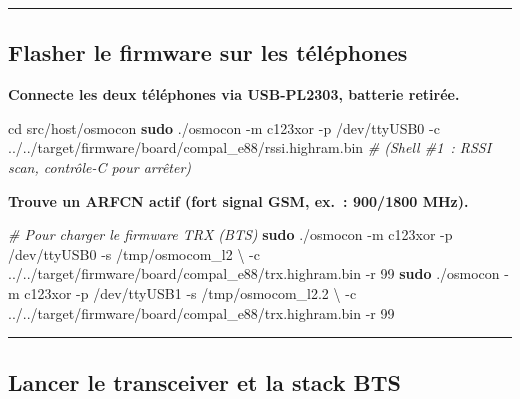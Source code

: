 \documentclass[
  french,
]{article}
\newenvironment{Shaded}{\begin{snugshade}}{\end{snugshade}}
\newcommand{\AttributeTok}[1]{\textcolor[rgb]{0.13,0.29,0.53}{#1}}
\newcommand{\BuiltInTok}[1]{#1}
\newcommand{\CommentTok}[1]{\textcolor[rgb]{0.56,0.35,0.01}{\textit{#1}}}
\newcommand{\DataTypeTok}[1]{\textcolor[rgb]{0.13,0.29,0.53}{#1}}
\newcommand{\FunctionTok}[1]{\textcolor[rgb]{0.13,0.29,0.53}{\textbf{#1}}}
\newcommand{\NormalTok}[1]{#1}
\begin{document}
\begin{center}\rule{0.5\linewidth}{0.5pt}\end{center}

\subsection{Flasher le firmware sur les
téléphones}\label{flasher-le-firmware-sur-les-tuxe9luxe9phones}

\textbf{Connecte les deux téléphones via USB-PL2303, batterie retirée.}

\begin{Shaded}
\begin{Highlighting}[]
\BuiltInTok{cd}\NormalTok{ src/host/osmocon}
\FunctionTok{sudo}\NormalTok{ ./osmocon }\AttributeTok{{-}m}\NormalTok{ c123xor }\AttributeTok{{-}p}\NormalTok{ /dev/ttyUSB0 }\AttributeTok{{-}c}\NormalTok{ ../../target/firmware/board/compal\_e88/rssi.highram.bin}
\CommentTok{\# (Shell \#1 : RSSI scan, contrôle{-}C pour arrêter)}
\end{Highlighting}
\end{Shaded}

\textbf{Trouve un ARFCN actif (fort signal GSM, ex.~: 900/1800 MHz).}

\begin{Shaded}
\begin{Highlighting}[]
\CommentTok{\# Pour charger le firmware TRX (BTS)}
\FunctionTok{sudo}\NormalTok{ ./osmocon }\AttributeTok{{-}m}\NormalTok{ c123xor }\AttributeTok{{-}p}\NormalTok{ /dev/ttyUSB0 }\AttributeTok{{-}s}\NormalTok{ /tmp/osmocom\_l2 }\DataTypeTok{\textbackslash{}}
  \AttributeTok{{-}c}\NormalTok{ ../../target/firmware/board/compal\_e88/trx.highram.bin }\AttributeTok{{-}r}\NormalTok{ 99}
\FunctionTok{sudo}\NormalTok{ ./osmocon }\AttributeTok{{-}m}\NormalTok{ c123xor }\AttributeTok{{-}p}\NormalTok{ /dev/ttyUSB1 }\AttributeTok{{-}s}\NormalTok{ /tmp/osmocom\_l2.2 }\DataTypeTok{\textbackslash{}}
  \AttributeTok{{-}c}\NormalTok{ ../../target/firmware/board/compal\_e88/trx.highram.bin }\AttributeTok{{-}r}\NormalTok{ 99}
\end{Highlighting}
\end{Shaded}

\begin{center}\rule{0.5\linewidth}{0.5pt}\end{center}

\subsection{Lancer le transceiver et la stack
BTS}\label{lancer-le-transceiver-et-la-stack-bts}
\end{document}
